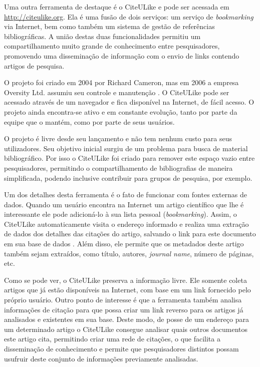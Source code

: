 Uma outra ferramenta de destaque é o CiteULike \cite{citeulike} e pode ser acessada em \url{http://citeulike.org}. Ela é uma fusão de dois serviços: um serviço de \emph{bookmarking} via Internet, bem como também um sistema de gestão de referências bibliográficas. A união destas duas funcionalidades permitiu um compartilhamento muito grande de conhecimento entre pesquisadores, promovendo uma disseminação de informação com o envio de links contendo artigos de pesquisa. 

O projeto foi criado em 2004 por Richard Cameron, mas em 2006 a empresa Oversity Ltd. assumiu seu controle e manutenção \cite{CiteULike-FAQ}. O CiteULike pode ser acessado através de um navegador e fica disponível na Internet, de fácil acesso. O projeto ainda encontra-se ativo e em constante evolução, tanto por parte da equipe que o mantém, como por parte de seus usuários.

O projeto é livre desde seu lançamento e não tem nenhum custo para seus utilizadores. Seu objetivo inicial surgiu de um problema para busca de material bibliográfico. Por isso o CiteULike foi criado para remover este espaço vazio entre pesquisadores, permitindo o compartilhamento de bibliografias de maneira simplificada, podendo inclusive contribuir para grupos de pesquisa, por exemplo.

Um dos detalhes desta ferramenta é o fato de funcionar com fontes externas de dados. Quando um usuário encontra na Internet um artigo científico que lhe é interessante ele pode adicioná-lo à sua lista pessoal (\emph{bookmarking}). Assim, o CiteULike automaticamente visita o endereço informado e realiza uma extração de dados dos detalhes das citações do artigo, salvando o link para este documento em sua base de dados \cite{citeulike}. Além disso, ele permite que os metadados deste artigo também sejam extraídos, como título, autores, \emph{journal name}, número de páginas, etc.

Como se pode ver, o CiteULike preserva a informação livre. Ele somente coleta artigos que já estão disponíveis na Internet, com base em um link fornecido pelo próprio usuário. Outro ponto de interesse é que a ferramenta também analisa informações de citação para que possa criar um link reverso para os artigos já analisados e existentes em sua base. Deste modo, de posse de um endereço para um determinado artigo o CiteULike consegue analisar quais outros documentos este artigo cita, permitindo criar uma rede de citações, o que facilita a disseminação de conhecimento e permite que pesquisadores distintos possam usufruir deste conjunto de informações previamente analisadas.


